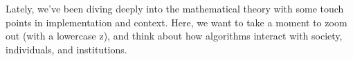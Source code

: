 \documentclass[assignment04_Solutions]{subfiles}
\begin{document}
Lately, we've been diving deeply into the mathematical theory with some touch points in implementation and context. Here, we want to take a moment to zoom out (with a lowercase z), and think about how algorithms interact with society, individuals, and institutions. 

%
%
\end{document}
